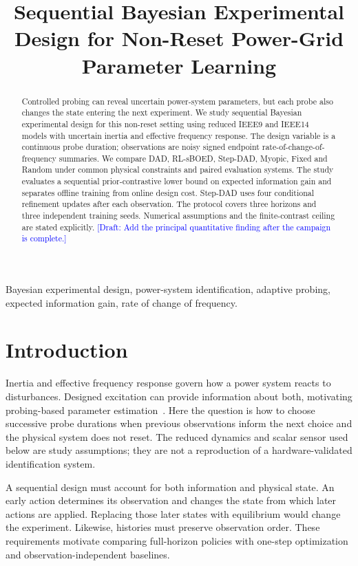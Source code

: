 \documentclass[conference]{IEEEtran}
\title{Sequential Bayesian Experimental Design for Non-Reset
Power-Grid Parameter Learning}
\author{\IEEEauthorblockN{Authors to be supplied}
\IEEEauthorblockA{Affiliations to be supplied}}
\newcommand{\draftnote}[1]{\textcolor{blue}{[Draft: #1]}}
\begin{document}
\maketitle
\begin{abstract}
Controlled probing can reveal uncertain power-system parameters, but each
probe also changes the state entering the next experiment. We study sequential
Bayesian experimental design for this non-reset setting using reduced IEEE9
and IEEE14 models with uncertain inertia and effective frequency response.
The design variable is a continuous probe duration; observations are noisy
signed endpoint rate-of-change-of-frequency summaries. We compare DAD,
RL-sBOED, Step-DAD, Myopic, Fixed and Random under common physical constraints
and paired evaluation systems. The study evaluates a sequential
prior-contrastive lower bound on expected information gain and separates
offline training from online design cost. Step-DAD uses four conditional
refinement updates after each observation. The protocol covers three horizons
and three independent training seeds. Numerical assumptions and the
finite-contrast ceiling are stated explicitly.
\draftnote{Add the principal quantitative finding after the campaign is complete.}
\end{abstract}
\begin{IEEEkeywords}
Bayesian experimental design, power-system identification, adaptive probing,
expected information gain, rate of change of frequency.
\end{IEEEkeywords}

\section{Introduction}
Inertia and effective frequency response govern how a power system reacts
to disturbances. Designed excitation can provide information about both,
motivating probing-based parameter estimation~\cite{peng2024probing}.
Here the question is how to choose successive probe durations when previous
observations inform the next choice and the physical system does not reset.
The reduced dynamics and scalar sensor used below are study assumptions;
they are not a reproduction of a hardware-validated identification system.

A sequential design must account for both information and physical state.
An early action determines its observation and changes the state from which
later actions are applied. Replacing those later states with equilibrium
would change the experiment. Likewise, histories must preserve observation
order. These requirements motivate comparing full-horizon policies with
one-step optimization and observation-independent baselines.
\end{document}
